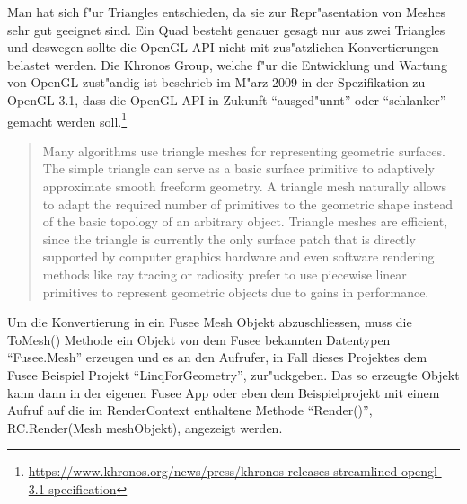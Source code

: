 \documentclass[pagesize, paper=a4, fontsize=12pt,titlepage=true, headings=small, headnosepline, abstractoff, liststotoc, nochapterprefix, plainheadsepline]{scrreprt}
\newcommand{\LFG}{LINQ For Geometry}
\begin{document}
Man hat sich f"ur Triangles entschieden, da sie zur Repr"asentation von Meshes sehr gut geeignet sind. Ein Quad besteht genauer gesagt nur aus zwei Triangles und deswegen sollte die OpenGL API nicht mit zus"atzlichen Konvertierungen belastet werden. Die Khronos Group, welche f"ur die Entwicklung und Wartung von OpenGL zust"andig ist beschrieb im M"arz 2009 in der Spezifikation zu OpenGL 3.1, dass die OpenGL API in Zukunft "`ausged"unnt"' oder "`schlanker"' gemacht werden soll.\footnote{\url{https://www.khronos.org/news/press/khronos-releases-streamlined-opengl-3.1-specification}}

\begin{quote}Many algorithms use triangle meshes for representing geometric surfaces. The simple triangle can serve as a basic surface primitive to adaptively approximate smooth freeform geometry. A triangle mesh naturally allows to adapt the required number of primitives to the geometric shape instead of the basic topology of an arbitrary object. Triangle meshes are efficient, since the triangle is currently the only surface patch that is directly supported by computer graphics hardware and even software rendering methods like ray tracing or radiosity prefer to use piecewise linear primitives to represent geometric objects due to gains in performance. \cite[S.~1]{Campagna.1998}\end{quote}

Um die Konvertierung in ein Fusee Mesh Objekt abzuschliessen, muss die ToMesh() Methode ein Objekt von dem Fusee bekannten Datentypen "`Fusee.Mesh"' erzeugen und es an den Aufrufer, in Fall dieses Projektes dem Fusee Beispiel Projekt "`LinqForGeometry"', zur"uckgeben. Das so erzeugte Objekt kann dann in der eigenen Fusee App oder eben dem Beispielprojekt mit einem Aufruf auf die im RenderContext enthaltene Methode "`Render()"', RC.Render(Mesh meshObjekt), angezeigt werden.

\end{document}
